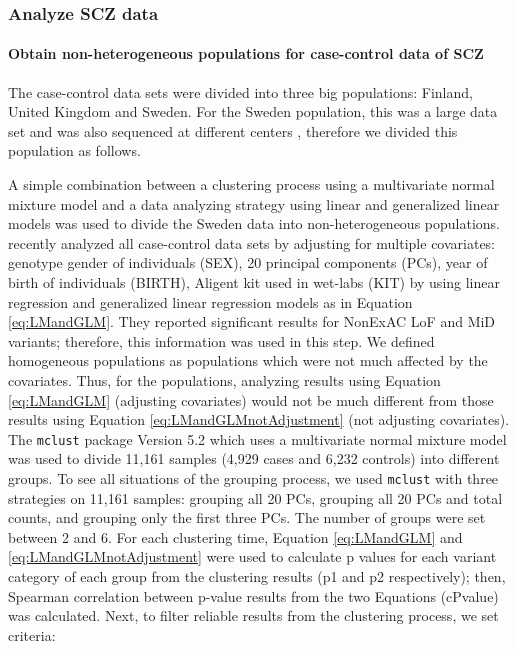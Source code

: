 \documentclass[]{article}
\begin{document}
\subsubsection{Analyze SCZ data}

\paragraph{Obtain non-heterogeneous populations for case-control data
  of SCZ}

The case-control data sets were divided into three big populations:
Finland, United Kingdom and Sweden. For the Sweden population, this
was a large data set and was also sequenced at different centers
\citep{genovese2016increased}, therefore we divided this population as follows.

A simple combination between a clustering process using a multivariate normal
mixture model and a data analyzing
strategy using linear and generalized linear models was used to divide
the Sweden data into non-heterogeneous populations.
\cite{genovese2016increased} recently analyzed all case-control data sets by
adjusting for multiple covariates: genotype gender of individuals (SEX), 20
principal components (PCs), year of birth of individuals (BIRTH), Aligent kit
used in wet-labs (KIT) by using linear regression and generalized
linear regression  models
as in Equation \ref{eq:LMandGLM}. They reported significant results
for NonExAC LoF and MiD variants; therefore, this information was used
in this step.
We defined homogeneous populations as populations which were not much
affected by the covariates. Thus, for the populations, analyzing
results using Equation \ref{eq:LMandGLM} (adjusting covariates)
would not be much different from those results using Equation
\ref{eq:LMandGLMnotAdjustment} (not adjusting covariates). The \texttt{mclust}
package Version 5.2 \citep{fraley1999mclust} which uses a multivariate
normal mixture model was used to divide 11,161
samples (4,929 cases and 6,232 controls) into different
groups. To see all situations of the grouping process, we used
\texttt{mclust} with three strategies on 11,161 samples: grouping all
20 PCs, grouping all 20 PCs and total counts, and grouping only the first three PCs.
The number of groups were set between 2 and 6. For each clustering
time, Equation \ref{eq:LMandGLM} and \ref{eq:LMandGLMnotAdjustment} were used
to calculate p values for each variant category of each group from the
clustering results (p1 and p2 respectively); then, Spearman correlation \citep{spearman1904proof} between p-value results
from the two Equations (cPvalue) was calculated. Next, to filter
reliable results from the clustering process, we set criteria:
\end{document}
